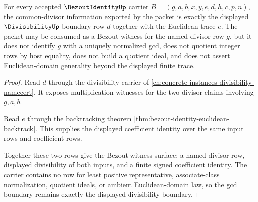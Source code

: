 \begin{theorem}
\label{thm:bezout-identity-gcd-divisibility-boundary}
For every accepted $\BezoutIdentityUp$ carrier $B=(g,a,b,x,y,e,d,h,c,p,n)$, the common-divisor information exported by the packet is exactly the displayed $\DivisibilityUp$ boundary row $d$ together with the Euclidean trace $e$. The packet may be consumed as a Bezout witness for the named divisor row $g$, but it does not identify $g$ with a uniquely normalized gcd, does not quotient integer rows by host equality, does not build a quotient ideal, and does not assert Euclidean-domain generality beyond the displayed finite trace.
\end{theorem}
\begin{proof}
Read $d$ through the divisibility carrier of \autoref{ch:concrete-instances-divisibility-namecert}. It exposes multiplication witnesses for the two divisor claims involving $g,a,b$.

Read $e$ through the backtracking theorem \autoref{thm:bezout-identity-euclidean-backtrack}. This supplies the displayed coefficient identity over the same input rows and coefficient rows.

Together these two rows give the Bezout witness surface: a named divisor row, displayed divisibility of both inputs, and a finite signed coefficient identity. The carrier contains no row for least positive representative, associate-class normalization, quotient ideals, or ambient Euclidean-domain law, so the gcd boundary remains exactly the displayed divisibility boundary.
\end{proof}




